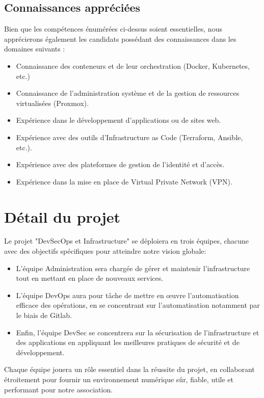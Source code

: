 \documentclass[12pt]{article}
\begin{document}
	\subsection{Connaissances appréciées}
    Bien que les compétences énumérées ci-dessus soient essentielles, nous apprécierons également les candidats possédant des connaissances dans les domaines suivants :
	\begin{itemize}
        \setlength\itemsep{0pt}
        \item Connaissance des conteneurs et de leur orchestration (Docker, Kubernetes, etc.)
        \item Connaissance de l'administration système et de la gestion de ressources virtualisées (Proxmox).
        \item Expérience dans le développement d'applications ou de sites web.
        \item Expérience avec des outils d'Infrastructure as Code (Terraform, Ansible, etc.).
        \item Expérience avec des plateformes de gestion de l'identité et d'accès.
        \item Expérience dans la mise en place de Virtual Private Network (VPN).
	\end{itemize}

    \section{Détail du projet}
    Le projet "DevSecOps et Infrastructure" se déploiera en trois équipes, chacune avec des objectifs spécifiques pour atteindre notre vision globale:
    \begin{itemize}
        \item L'équipe Administration sera chargée de gérer et maintenir l'infrastructure tout en mettant en place de nouveaux services. 
        \item L'équipe DevOps aura pour tâche de mettre en œuvre l'automatisation efficace des opérations, en se concentrant sur l'automatisation notamment par le biais de Gitlab. 
        \item Enfin, l'équipe DevSec se concentrera sur la sécurisation de l'infrastructure et des applications en appliquant les meilleures pratiques de sécurité et de développement. 
    \end{itemize}

    \noindent Chaque équipe jouera un rôle essentiel dans la réussite du projet, en collaborant étroitement pour fournir un environnement numérique sûr, fiable, utile et performant pour notre association.
\end{document}
